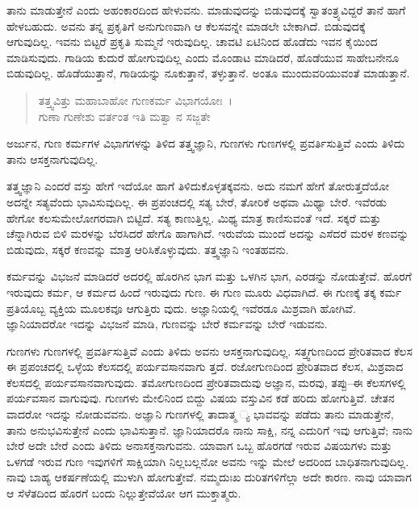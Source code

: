 ತಾನು ಮಾಡುತ್ತೇನೆ ಎಂದು ಅಹಂಕಾರದಿಂದ ಹೇಳುವನು. ಮಾಡುವುದನ್ನು ಬಿಡುವುದಕ್ಕೆ ಸ್ವಾತಂತ್ರ್ಯವಿದ್ದರೆ ತಾನೆ ಹಾಗೆ ಹೇಳಬಹುದು. ಅವನು ತನ್ನ ಪ್ರಕೃತಿಗೆ ಅನುಗುಣವಾಗಿ ಆ ಕೆಲಸವನ್ನೇ ಮಾಡಲೇ ಬೇಕಾಗಿದೆ. ಬಿಡುವುದಕ್ಕೆ ಆಗುವುದಿಲ್ಲ. ಇವನು ಬಿಟ್ಟರೆ ಪ್ರಕೃತಿ ಸುಮ್ಮನೆ ಇರುವುದಿಲ್ಲ. ಚಾವಟಿ ಏಟಿನಿಂದ ಹೊಡೆದು ಇವನ ಕೈಯಿಂದ ಮಾಡಿಸುವುದು. ಗಾಡಿಯ ಕುದುರೆ ಹೋಗುವುದಿಲ್ಲ ಎಂದು ಮೊಂಡಾಟ ಮಾಡಿದರೆ, ಹೊಡೆಯುವ ಸಾಹೇಬನೇನೂ ಬಿಡುವುದಿಲ್ಲ. ಹೊಡೆಯುತ್ತಾನೆ, ಗಾಡಿಯನ್ನು ನೂಕುತ್ತಾನೆ, ತಳ್ಳುತ್ತಾನೆ. ಅಂತೂ ಮುಂದುವರಿಯುವಂತೆ ಮಾಡುತ್ತಾನೆ.

\begin{verse}
ತತ್ತ್ವವಿತ್ತು ಮಹಾಬಾಹೋ ಗುಣಕರ್ಮ ವಿಭಾಗಯೋಃ~।\\ಗುಣಾ ಗುಣೇಶು ವರ್ತಂತ ಇತಿ ಮತ್ವಾ ನ ಸಜ್ಜತೇ 
\end{verse}

{\small ಅರ್ಜುನ, ಗುಣ ಕರ್ಮಗಳ ವಿಭಾಗಗಳನ್ನು ತಿಳಿದ ತತ್ತ್ವಜ್ಞಾನಿ, ಗುಣಗಳು ಗುಣಗಳಲ್ಲಿ ಪ್ರವರ್ತಿಸುತ್ತಿವೆ ಎಂದು ತಿಳಿದು ತಾನು ಆಸಕ್ತನಾಗುವುದಿಲ್ಲ.}

ತತ್ತ್ವಜ್ಞಾನಿ ಎಂದರೆ ವಸ್ತು ಹೇಗೆ ಇದೆಯೋ ಹಾಗೆ ತಿಳಿದುಕೊಳ್ಳತಕ್ಕವನು. ಅದು ನಮಗೆ ಹೇಗೆ ತೋರುತ್ತದೆಯೋ ಅದನ್ನೇ ಸತ್ಯವೆಂದು ಭಾವಿಸುವುದಿಲ್ಲ. ಈ ಪ್ರಪಂಚದಲ್ಲಿ ಸತ್ಯ ಬೇರೆ, ತೋರಿಕೆ ಅಥವಾ ಮಿಥ್ಯಾ ಬೇರೆ. ಇವೆರಡು ಹೇಗೋ ಕಲಸುಮೇಲೋಗರವಾಗಿ ಬಿಟ್ಟಿದೆ. ಸತ್ಯ ಕಾಣುತ್ತಿಲ್ಲ. ಮಿಥ್ಯ ಮಾತ್ರ ಕಾಣಿಸುವಂತೆ ಇದೆ. ಸಕ್ಕರೆ ಮತ್ತು ಚೆನ್ನಾಗಿರುವ ಬಿಳಿ ಮರಳನ್ನು ಬೆರಸಿದರೆ ಹೇಗೊ ಹಾಗಾಗಿದೆ. ಇರುವೆಯ ಮುಂದೆ ಅದನ್ನು ಎಸೆದರೆ ಮರಳ ಕಣವನ್ನು ಬಿಡುವುದು, ಸಕ್ಕರೆ ಕಣವನ್ನು ಮಾತ್ರ ಆರಿಸಿಕೊಳ್ಳುವುದು. ತತ್ತ್ವಜ್ಞಾನಿ ಇಂತಹವನು.

ಕರ್ಮವನ್ನು ವಿಭಜನೆ ಮಾಡಿದರೆ ಅದರಲ್ಲಿ ಹೊರಗಿನ ಭಾಗ ಮತ್ತು ಒಳಗಿನ ಭಾಗ, ಎರಡನ್ನು ನೋಡುತ್ತೇವೆ. ಹೊರಗೆ ಇರುವುದು ಕರ್ಮ, ಆ ಕರ್ಮದ ಹಿಂದೆ ಇರುವುದು ಗುಣ. ಈ ಗುಣ ಮೂರು ವಿಧವಾಗಿದೆ. ಈ ಗುಣಕ್ಕೆ ತಕ್ಕ ಕರ್ಮ ಪ್ರತಿಯೊಬ್ಬ ವ್ಯಕ್ತಿಯ ಮೂಲಕವೂ ಆಗುತ್ತಿರು ವುದು. ಅಜ್ಞಾನಿಯಲ್ಲಿ ಇವೆರಡೂ ಮಿಶ್ರವಾಗಿ ಹೋಗಿವೆ. ಜ್ಞಾನಿಯಾದರೋ ಇದನ್ನು ವಿಭಜನೆ ಮಾಡಿ, ಗುಣವನ್ನು ಬೇರೆ ಕರ್ಮವನ್ನು ಬೇರೆ ಇಡುವನು.

ಗುಣಗಳು ಗುಣಗಳಲ್ಲಿ ಪ್ರವರ್ತಿಸುತ್ತಿವೆ ಎಂದು ತಿಳಿದು ಅವನು ಆಸಕ್ತನಾಗುವುದಿಲ್ಲ. ಸತ್ತ್ವಗುಣದಿಂದ ಪ್ರೇರಿತವಾದ ಕೆಲಸ ಈ ಪ್ರಪಂಚದಲ್ಲಿ ಒಳ್ಳೆಯ ಕೆಲಸದಲ್ಲಿ ಪರ್ಯವಸಾನವಾಗು ತ್ತದೆ. ರಜೋಗುಣದಿಂದ ಪ್ರೇರಿತವಾದ ಕೆಲಸ, ಮಿಶ್ರವಾದ ಕೆಲಸದಲ್ಲಿ ಪರ್ಯವಸಾನವಾಗುವುದು. ತಮೋಗುಣದಿಂದ ಪ್ರೇರಿತವಾದುವು ಅಜ್ಞಾನ, ಮರವು, ತಪ್ಪು–ಈ ಕೆಲಸಗಳಲ್ಲಿ ಪರ್ಯವಸಾನ ವಾಗುವುವು. ಗುಣಗಳು ಮೇಲಿನಿಂದ ಬಿದ್ದು ವಿಷಯ ವಸ್ತುವಿನ ಕಡೆ ಹರಿದು ಹೋಗುತ್ತಿವೆ. ಚೇತನ ವಾದರೋ ಇದನ್ನು ನೋಡುವವನು. ಅಜ್ಞಾನಿ ಗುಣಗಳಲ್ಲಿ ತಾದಾತ್ಮ ್ಯ ಭಾವವನ್ನು ಪಡೆದು ತಾನು ಮಾಡುತ್ತೇನೆ, ತಾನು ಅನುಭವಿಸುತ್ತೇನೆ ಎಂದು ಭಾವಿಸುತ್ತಾನೆ. ಜ್ಞಾನಿಯಾದರೊ ನಾನು ಸಾಕ್ಷಿ, ನನ್ನ ಎದುರಿಗೆ ಇವು ಆಗುತ್ತಿವೆ; ನಾನು ಬೇರೆ ಅದೇ ಬೇರೆ ಎಂದು ತಿಳಿದು ಅನಾಸಕ್ತನಾಗುವನು. ಯಾವಾಗ ಒಬ್ಬ ಹೊರಗಡೆ ಇರುವ ವಿಷಯಗಳು ಮತ್ತು ಒಳಗಡೆ ಇರುವ ಗುಣ ಇವುಗಳಿಗೆ ಸಾಕ್ಷಿಯಾಗಿ ನಿಲ್ಲಬಲ್ಲನೋ ಅವನು ಇನ್ನು ಮೇಲೆ ಅದರಿಂದ ಬಾಧಿತನಾಗುವುದಿಲ್ಲ. ನಾವು ಬಾಹ್ಯ ಆಕರ್ಷಣೆಯಲ್ಲಿ ಮುಳುಗಿ ಹೋಗುತ್ತೇವೆ. ನಮ್ಮದುಃಖ ದುರಿತಗಳಿಗೆಲ್ಲಾ ಅದೇ ಕಾರಣ. ನಾವು ಯಾವಾಗ ಆ ಸೆಳೆತದಿಂದ ಹೊರಗೆ ಬಂದು ನಿಲ್ಲುತ್ತೇವೆಯೋ ಆಗ ಮುಕ್ತಾತ್ಮರು.

